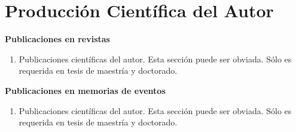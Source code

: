 \clearpage
\pagestyle{fancy} %

\chapter*{Producci\'on Cient\'ifica del Autor}

\textbf{\large{Publicaciones en revistas}}
\begin{enumerate}
	\item Publicaciones científicas del autor. Esta sección puede ser obviada. Sólo es requerida en tesis de maestría y doctorado.
\end{enumerate}

\textbf{\large{Publicaciones en memorias de eventos}}
\begin{enumerate}
	\item Publicaciones científicas del autor. Esta sección puede ser obviada. Sólo es requerida en tesis de maestría y doctorado.
\end{enumerate}